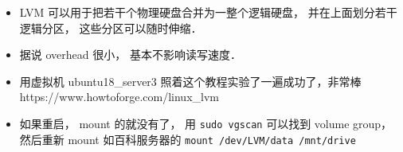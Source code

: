 
\begin{issues}
\issueDraft
\end{issues}

\begin{itemize}
\item LVM 可以用于把若干个物理硬盘合并为一整个逻辑硬盘， 并在上面划分若干逻辑分区， 这些分区可以随时伸缩．
\item 据说 overhead 很小， 基本不影响读写速度．
\item 用虚拟机 ubuntu18_server3 照着这个教程实验了一遍成功了，非常棒 https://www.howtoforge.com/linux_lvm
\item 如果重启， mount 的就没有了， 用 \verb`sudo vgscan` 可以找到 volume group， 然后重新 mount 如百科服务器的 \verb`mount /dev/LVM/data /mnt/drive`
\end{itemize}
